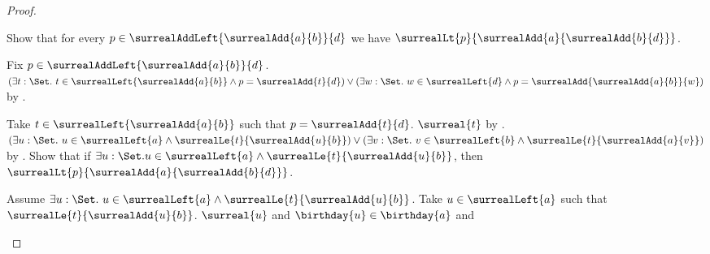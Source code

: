 \begin{proof}
\begin{subproof}
\begin{subproof}
\begin{byCase}
            \end{byCase}
        \end{subproof}
        Show that for every
            $p\in{}$ we have
            $$.
        \begin{subproof}
            Fix $p\in{}$.
            $(\exists t:\Set.\ t\in{}\land
                    p=)
                \lor
                (\exists w:\Set.\ w\in{}\land
                    p=)$
                by .
            \begin{byCase}
                    Take $t\in{}$ such that
                        $p=$.
                    $$ by
                        .
                    $(\exists u:\Set.\ u\in{}\land
                            )
                        \lor
                        (\exists v:\Set.\ v\in{}\land
                            )$
                        by .
                    Show that if $\exists u:\Set.
                            u\in{}\land
                            $, then
                        $$.
                    \begin{subproof}
                        Assume $\exists u:\Set.\ u\in{}\land
                            $.
                        Take $u\in{}$ such that
                            $$.
                        $$ and $\in{}$ and

\end{subproof}
\end{byCase}
\end{subproof}
\end{subproof}
\end{proof}

